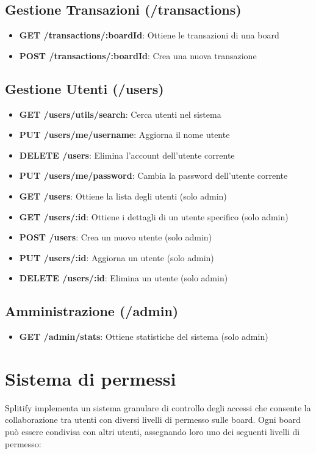 \documentclass[11pt]{article}
\begin{document}
\subsection{Gestione Transazioni (/transactions)}
\begin{itemize}
    \item \textbf{GET /transactions/:boardId}: Ottiene le transazioni di una board
    \item \textbf{POST /transactions/:boardId}: Crea una nuova transazione
\end{itemize}

\subsection{Gestione Utenti (/users)}
\begin{itemize}
    \item \textbf{GET /users/utils/search}: Cerca utenti nel sistema
    \item \textbf{PUT /users/me/username}: Aggiorna il nome utente
    \item \textbf{DELETE /users}: Elimina l'account dell'utente corrente
    \item \textbf{PUT /users/me/password}: Cambia la password dell'utente corrente

    \item \textbf{GET /users}: Ottiene la lista degli utenti (solo admin)
    \item \textbf{GET /users/:id}: Ottiene i dettagli di un utente specifico (solo admin)
    \item \textbf{POST /users}: Crea un nuovo utente (solo admin)
    \item \textbf{PUT /users/:id}: Aggiorna un utente (solo admin)
    \item \textbf{DELETE /users/:id}: Elimina un utente (solo admin)
\end{itemize}

\subsection{Amministrazione (/admin)}
\begin{itemize}
    \item \textbf{GET /admin/stats}: Ottiene statistiche del sistema (solo admin)
\end{itemize}


\section{Sistema di permessi}
Splitify implementa un sistema granulare di controllo degli accessi che consente la collaborazione tra utenti con diversi livelli di permesso sulle board. Ogni board può essere condivisa con altri utenti, assegnando loro uno dei seguenti livelli di permesso:
\end{document}
